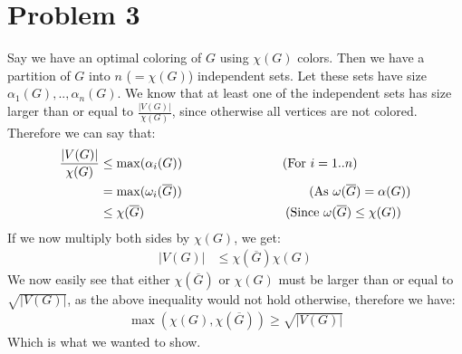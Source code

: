 \documentclass[a4paper]{article}
\newcommand{\comment}[1]{%
  \text{\phantom{(#1)}} \tag{#1}}
\begin{document}
\section{Problem 3}
Say we have an optimal coloring of $G$ using $\chi(G)$ colors. Then we have a partition of $G$ into $n$ ($=\chi(G)$) independent sets. Let these sets have size $\alpha_1(G),..,\alpha_n(G)$. We know that at least one of the independent sets has size larger than or equal to $\frac{|V(G)|}{\chi(G)}$, since otherwise all vertices are not colored. Therefore we can say that:
\begin{align*}
  \frac{|V(G)|}{\chi(G)}&\leq \max(\alpha_i(G)) \comment{For $i=1..n$} \\
                        &=\max(\omega_i(\overline{G})) \comment{As $\omega(\overline{G})=\alpha(G)$} \\
                        &\leq \chi(\overline{G}) \comment{Since $\omega(\overline{G})\leq \chi({G})$}
\end{align*}
If we now multiply both sides by $\chi(G)$, we get:
\begin{align*}
  |V(G)|&\leq \chi(\overline{G})\chi(G)
\end{align*}
We now easily see that either $\chi(\overline{G})$ or $\chi(G)$ must be larger than or equal to $\sqrt{|V(G)|}$, as the above inequality would not hold otherwise, therefore we have:
\begin{align*}
  \max(\chi(G), \chi(\overline{G}))\geq \sqrt{|V(G)|}
\end{align*}
Which is what we wanted to show.
\end{document}
